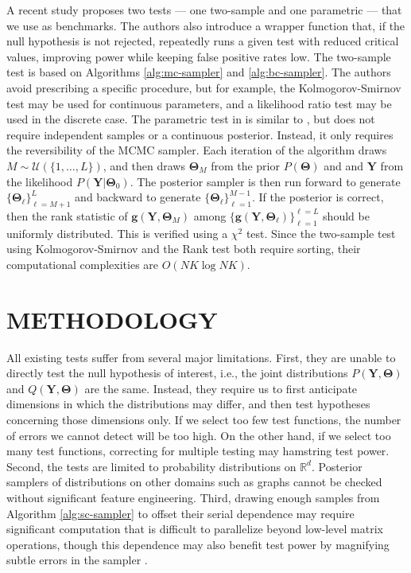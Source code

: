 \documentclass[a4paper,12pt]{article}
\begin{document}
A recent study \cite{gandy_unit_2020} proposes two tests --- one two-sample and one parametric --- that we use as benchmarks. The authors also introduce a wrapper function that, if the null hypothesis is not rejected, repeatedly runs a given test with reduced critical values, improving power while keeping false positive rates low. The two-sample test is based on Algorithms \ref{alg:mc-sampler} and \ref{alg:bc-sampler}. The authors avoid prescribing a specific procedure, but for example, the Kolmogorov-Smirnov test may be used for continuous parameters, and a likelihood ratio test may be used in the discrete case. The parametric test in \cite{gandy_unit_2020} is similar to \cite{talts_validating_2018}, but does not require independent samples or a continuous posterior. Instead, it only requires the reversibility of the MCMC sampler. Each iteration of the algorithm draws $M \sim \mathcal{U}(\{1, \ldots, L\})$, and then draws $\mathbf{\Theta}_{M}$ from the prior $P(\mathbf{\Theta})$ and and $\mathbf{Y}$ from the likelihood $P(\mathbf{Y}|\mathbf{\Theta}_{0})$.  The posterior sampler is then run forward to generate $\{\mathbf{\Theta}_{\ell}\}_{\ell=M+1}^{L}$ and backward to generate $\{\mathbf{\Theta}_{\ell}\}_{\ell=1}^{M-1}$. If the posterior is correct, then the rank statistic of $\mathbf{g}(\mathbf{Y},\mathbf{\Theta}_{M})$ among $\{\mathbf{g}(\mathbf{Y},\mathbf{\Theta}_{\ell})\}_{\ell=1}^{\ell=L}$ should be uniformly distributed. This is verified using a $\chi^{2}$ test. Since the two-sample test using Kolmogorov-Smirnov and the Rank test both require sorting, their computational complexities are $O(NK \log NK)$.

\section{METHODOLOGY}
All existing tests suffer from several major limitations. First, they are unable to directly test the null hypothesis of interest, i.e., the joint distributions $P(\mathbf{Y}, \mathbf{\Theta})$ and $Q(\mathbf{Y}, \mathbf{\Theta})$ are the same. Instead, they require us to first anticipate dimensions in which the distributions may differ, and then test hypotheses concerning those dimensions only. If we select too few test functions, the number of errors we cannot detect will be too high. On the other hand, if we select too many test functions, correcting for multiple testing may hamstring test power. Second, the tests are limited to probability distributions on $\mathbb{R}^{d}$. Posterior samplers of distributions on other domains such as graphs cannot be checked without significant feature engineering. Third, drawing enough samples from Algorithm \ref{alg:sc-sampler} to offset their serial dependence may require significant computation that is difficult to parallelize beyond low-level matrix operations, though this dependence may also benefit test power by magnifying subtle errors in the sampler \cite{grosse_testing_2014}. 
\end{document}
